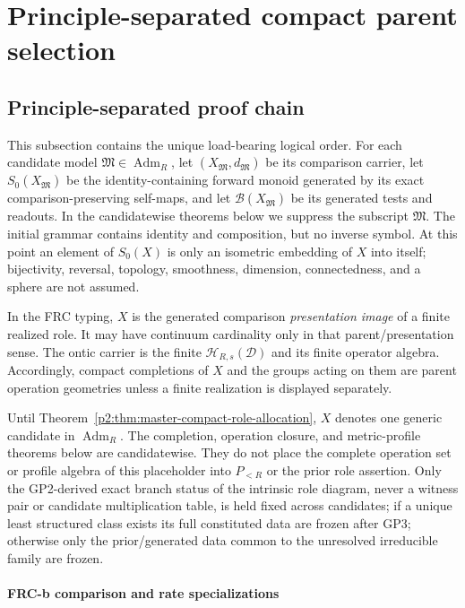 \documentclass[12pt,a4paper]{article}
\begin{document}
\section{Principle-separated compact parent selection}
\label{paper2a:sec:organized-selection}

\subsection{Principle-separated proof chain}
\label{p2:subsec:principle-separated-chain}

This subsection contains the unique load-bearing logical order.  For each
candidate model \(\mathfrak M\in\operatorname{Adm}_R\), let
\((X_{\mathfrak M},d_{\mathfrak M})\) be its comparison carrier, let
\(S_0(X_{\mathfrak M})\) be the identity-containing forward monoid generated
by its exact comparison-preserving self-maps, and let
\(\mathcal B(X_{\mathfrak M})\) be its generated tests and readouts.  In the
candidatewise theorems below we suppress the subscript \(\mathfrak M\).
The initial grammar contains identity and composition, but no inverse symbol.
At this point an element of \(S_0(X)\) is only an isometric embedding of
\(X\) into itself; bijectivity, reversal, topology, smoothness, dimension,
connectedness, and a sphere are not assumed.

In the FRC typing, \(X\) is the generated comparison
\emph{presentation image} of a finite realized role.  It may have continuum
cardinality only in that parent/presentation sense.  The ontic carrier is the
finite \(\mathcal H_{R,s}(\mathcal D)\) and its finite operator algebra.
Accordingly, compact completions of \(X\) and the groups acting on them are
parent operation geometries unless a finite realization is displayed
separately.

Until Theorem~\ref{p2:thm:master-compact-role-allocation}, \(X\) denotes one
generic candidate in \(\operatorname{Adm}_R\).  The completion,
operation closure, and metric-profile theorems below are candidatewise.  They
do not place the complete operation set or profile algebra of this placeholder
into \(P_{<R}\) or the prior role assertion.  Only the GP2-derived exact branch
status of the intrinsic role diagram, never a witness pair or candidate
multiplication table, is held fixed across candidates;
if a unique least structured class exists its full constituted data are
frozen after GP3; otherwise only the prior/generated data common to the
unresolved irreducible family are frozen.

\paragraph{FRC-b comparison and rate specializations}
\end{document}
